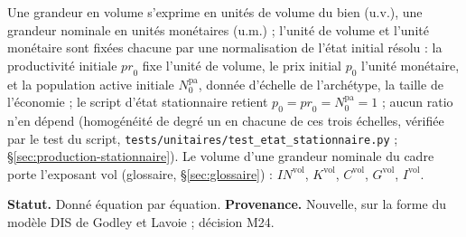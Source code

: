 \documentclass[11pt,a4paper]{article}
\begin{document}
Une grandeur en volume s'exprime en unités de volume du bien (u.v.), une grandeur nominale en unités monétaires (u.m.) ; l'unité de volume et l'unité monétaire sont fixées chacune par une normalisation de l'état initial résolu : la productivité initiale $\mathit{pr}_0$ fixe l'unité de volume, le prix initial $p_0$ l'unité monétaire, et la population active initiale $N^{\mathrm{pa}}_0$, donnée d'échelle de l'archétype, la taille de l'économie ; le script d'état stationnaire retient $p_0 = \mathit{pr}_0 = N^{\mathrm{pa}}_0 = 1$ ; aucun ratio n'en dépend (homogénéité de degré un en chacune de ces trois échelles, vérifiée par le test du script, \nolinkurl{tests/unitaires/test_etat_stationnaire.py} ; \S\ref{sec:production-stationnaire}). Le volume d'une grandeur nominale du cadre porte l'exposant $\mathrm{vol}$ (glossaire, \S\ref{sec:glossaire}) : $\mathit{IN}^{\mathrm{vol}}$, $K^{\mathrm{vol}}$, $C^{\mathrm{vol}}$, $G^{\mathrm{vol}}$, $I^{\mathrm{vol}}$.

\textbf{Statut.} Donné équation par équation. \textbf{Provenance.} Nouvelle, sur la forme du modèle DIS de Godley et Lavoie ; décision M24.
\end{document}
